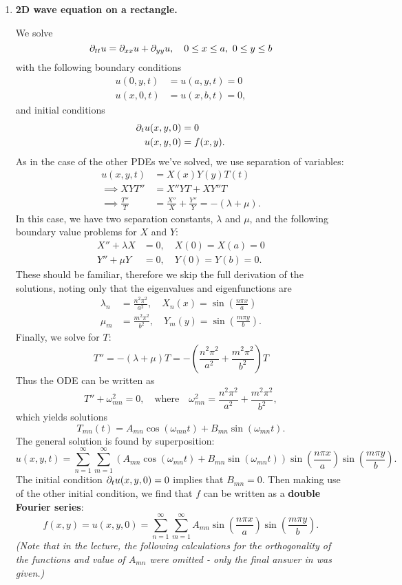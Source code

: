 \begin{enumerate}
	\item \textbf{2D wave equation on a rectangle.}
	
	We solve
	\[
	\partial_{tt}u = \partial_{xx}u + \partial_{yy}u, \quad 0 \leq x \leq a, \,\, 0 \leq y \leq b
	\]
	with the following boundary conditions
	\begin{align*}
		u(0,y,t) &= u(a,y,t) = 0 \\
		u(x,0,t) &= u(x,b,t) = 0,
	\end{align*}
	and initial conditions
	\begin{align*}
		\partial_tu(x,y,0) &= 0 \\
		u(x,y,0) &= f(x,y).
	\end{align*}
	As in the case of the other PDEs we've solved, we use separation of variables:
	\begin{align*}
		u(x,y,t) &= X(x)Y(y)T(t) \\
		\implies XYT'' &= X''YT + XY''T \\
		\implies \frac{T''}{T} &= \frac{X''}{X} + \frac{Y''}{Y} = -(\lambda + \mu).
	\end{align*}
	In this case, we have two separation constants, $\lambda$ and $\mu$, and the following boundary value problems for $X$ and $Y$:
	\begin{align*}
		X'' + \lambda X &= 0, \quad X(0) = X(a) = 0 \\
		Y'' + \mu Y &= 0, \quad Y(0) = Y(b) = 0.
	\end{align*}
	These should be familiar, therefore we skip the full derivation of the solutions, noting only that the eigenvalues and eigenfunctions are
	\begin{align*}
		\lambda_n &= \frac{n^2\pi^2}{a^2}, \quad X_n(x) = \sin\left(\frac{n\pi x}{a}\right) \\
		\mu_m &= \frac{m^2\pi^2}{b^2}, \quad Y_m(y) = \sin\left(\frac{m\pi y}{b}\right).
	\end{align*}
	Finally, we solve for $T$:
	\[
	T'' = -(\lambda + \mu)T = -\left(\frac{n^2\pi^2}{a^2} + \frac{m^2\pi^2}{b^2}\right)T
	\]
	Thus the ODE can be written as
	\[
	T'' + \omega^2_{mn} = 0, \quad\text{where}\quad \omega^2_{mn} = \frac{n^2\pi^2}{a^2} + \frac{m^2\pi^2}{b^2},
	\]
	which yields solutions
	\[
	T_{mn}(t) = A_{mn}\cos(\omega_{mn}t) + B_{mn}\sin(\omega_{mn}t).
	\]
	The general solution is found by superposition:
	\[
	u(x,y,t) = \sum_{n=1}^{\infty} \sum_{m=1}^{\infty} \left(A_{mn}\cos(\omega_{mn}t) + B_{mn}\sin(\omega_{mn}t) \right) \sin\left(\frac{n\pi x}{a}\right) \sin\left(\frac{m\pi y}{b}\right).
	\]
	The initial condition $\partial_tu(x,y,0) = 0$ implies that $B_{mn} = 0$. Then making use of the other initial condition, we find that $f$ can be written as a \textbf{double Fourier series}:
	\[
	f(x,y) = u(x,y,0) = \sum_{n=1}^{\infty} \sum_{m=1}^{\infty} A_{mn} \sin\left(\frac{n\pi x}{a}\right) \sin\left(\frac{m\pi y}{b}\right).
	\]
	\emph{(Note that in the lecture, the following calculations for the orthogonality of the functions and value of $A_{mn}$ were omitted - only the final answer in  was given.)}
	

\end{enumerate}
